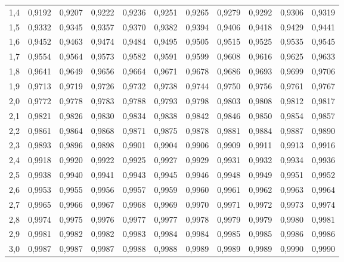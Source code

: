 \begin{table}[ht]
\begin{tabular}{@{}c|cccccccccc@{}}
1{,}4 & 0{,}9192 & 0{,}9207 & 0{,}9222 & 0{,}9236 & 0{,}9251 & 0{,}9265 & 0{,}9279 & 0{,}9292 & 0{,}9306 & 0{,}9319 \\
1{,}5 & 0{,}9332 & 0{,}9345 & 0{,}9357 & 0{,}9370 & 0{,}9382 & 0{,}9394 & 0{,}9406 & 0{,}9418 & 0{,}9429 & 0{,}9441 \\
1{,}6 & 0{,}9452 & 0{,}9463 & 0{,}9474 & 0{,}9484 & 0{,}9495 & 0{,}9505 & 0{,}9515 & 0{,}9525 & 0{,}9535 & 0{,}9545 \\
1{,}7 & 0{,}9554 & 0{,}9564 & 0{,}9573 & 0{,}9582 & 0{,}9591 & 0{,}9599 & 0{,}9608 & 0{,}9616 & 0{,}9625 & 0{,}9633 \\
1{,}8 & 0{,}9641 & 0{,}9649 & 0{,}9656 & 0{,}9664 & 0{,}9671 & 0{,}9678 & 0{,}9686 & 0{,}9693 & 0{,}9699 & 0{,}9706 \\
1{,}9 & 0{,}9713 & 0{,}9719 & 0{,}9726 & 0{,}9732 & 0{,}9738 & 0{,}9744 & 0{,}9750 & 0{,}9756 & 0{,}9761 & 0{,}9767 \\
2{,}0 & 0{,}9772 & 0{,}9778 & 0{,}9783 & 0{,}9788 & 0{,}9793 & 0{,}9798 & 0{,}9803 & 0{,}9808 & 0{,}9812 & 0{,}9817 \\
2{,}1 & 0{,}9821 & 0{,}9826 & 0{,}9830 & 0{,}9834 & 0{,}9838 & 0{,}9842 & 0{,}9846 & 0{,}9850 & 0{,}9854 & 0{,}9857 \\
2{,}2 & 0{,}9861 & 0{,}9864 & 0{,}9868 & 0{,}9871 & 0{,}9875 & 0{,}9878 & 0{,}9881 & 0{,}9884 & 0{,}9887 & 0{,}9890 \\
2{,}3 & 0{,}9893 & 0{,}9896 & 0{,}9898 & 0{,}9901 & 0{,}9904 & 0{,}9906 & 0{,}9909 & 0{,}9911 & 0{,}9913 & 0{,}9916 \\
2{,}4 & 0{,}9918 & 0{,}9920 & 0{,}9922 & 0{,}9925 & 0{,}9927 & 0{,}9929 & 0{,}9931 & 0{,}9932 & 0{,}9934 & 0{,}9936 \\
2{,}5 & 0{,}9938 & 0{,}9940 & 0{,}9941 & 0{,}9943 & 0{,}9945 & 0{,}9946 & 0{,}9948 & 0{,}9949 & 0{,}9951 & 0{,}9952 \\
2{,}6 & 0{,}9953 & 0{,}9955 & 0{,}9956 & 0{,}9957 & 0{,}9959 & 0{,}9960 & 0{,}9961 & 0{,}9962 & 0{,}9963 & 0{,}9964 \\
2{,}7 & 0{,}9965 & 0{,}9966 & 0{,}9967 & 0{,}9968 & 0{,}9969 & 0{,}9970 & 0{,}9971 & 0{,}9972 & 0{,}9973 & 0{,}9974 \\
2{,}8 & 0{,}9974 & 0{,}9975 & 0{,}9976 & 0{,}9977 & 0{,}9977 & 0{,}9978 & 0{,}9979 & 0{,}9979 & 0{,}9980 & 0{,}9981 \\
2{,}9 & 0{,}9981 & 0{,}9982 & 0{,}9982 & 0{,}9983 & 0{,}9984 & 0{,}9984 & 0{,}9985 & 0{,}9985 & 0{,}9986 & 0{,}9986 \\
3{,}0 & 0{,}9987 & 0{,}9987 & 0{,}9987 & 0{,}9988 & 0{,}9988 & 0{,}9989 & 0{,}9989 & 0{,}9989 & 0{,}9990 & 0{,}9990 \\

\end{tabular}
\end{table}
